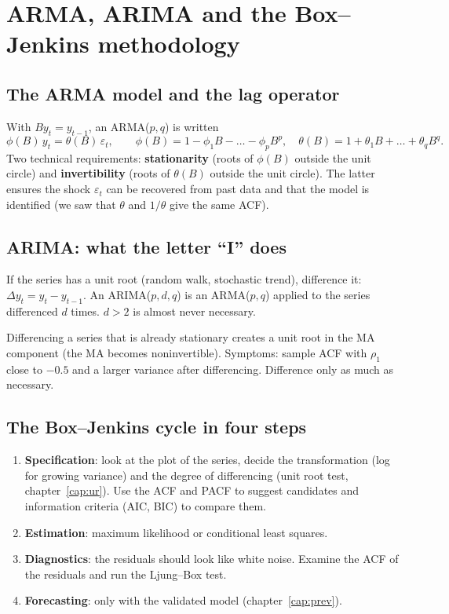 \chapter{ARMA, ARIMA and the Box--Jenkins methodology}
\label{cap:arma}

\section{The ARMA model and the lag operator}
With $B y_t=y_{t-1}$, an ARMA($p,q$) is written
\[
\phi(B)\,y_t=\theta(B)\,\varepsilon_t,\qquad \phi(B)=1-\phi_1B-\dots-\phi_pB^p,\quad \theta(B)=1+\theta_1B+\dots+\theta_qB^q.
\]
Two technical requirements: \textbf{stationarity} (roots of $\phi(B)$ outside the unit circle) and \textbf{invertibility} (roots of $\theta(B)$ outside the unit circle). The latter ensures the shock $\varepsilon_t$ can be recovered from past data and that the model is identified (we saw that $\theta$ and $1/\theta$ give the same ACF).

\section{ARIMA: what the letter ``I'' does}
If the series has a unit root (random walk, stochastic trend), difference it: $\Delta y_t=y_t-y_{t-1}$. An ARIMA($p,d,q$) is an ARMA($p,q$) applied to the series differenced $d$ times. $d>2$ is almost never necessary.

\begin{atencao}[Overdifferencing]
Differencing a series that is already stationary creates a unit root in the MA component (the MA becomes noninvertible). Symptoms: sample ACF with $\rho_1$ close to $-0.5$ and a larger variance after differencing. Difference only as much as necessary.
\end{atencao}

\section{The Box--Jenkins cycle in four steps}
\begin{enumerate}[leftmargin=1.6em]
\item \textbf{Specification}: look at the plot of the series, decide the transformation (log for growing variance) and the degree of differencing (unit root test, chapter~\ref{cap:ur}). Use the ACF and PACF to suggest candidates and information criteria (AIC, BIC) to compare them.
\item \textbf{Estimation}: maximum likelihood or conditional least squares.
\item \textbf{Diagnostics}: the residuals should look like white noise. Examine the ACF of the residuals and run the Ljung--Box test.
\item \textbf{Forecasting}: only with the validated model (chapter~\ref{cap:prev}).
\end{enumerate}

